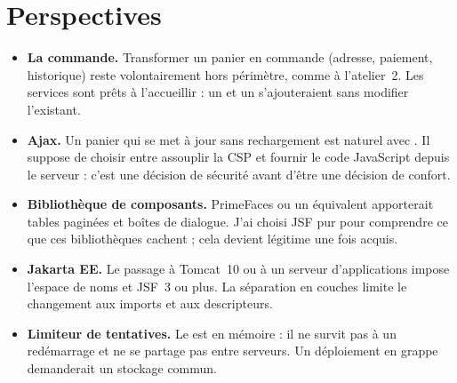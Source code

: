 \chapter{Perspectives}\label{chap:perspectives}

\begin{itemize}
  \item \textbf{La commande.} Transformer un panier en commande (adresse, paiement, historique) reste volontairement
        hors périmètre, comme à l'atelier~2. Les services sont prêts à l'accueillir : un  et un
         s'ajouteraient sans modifier l'existant.
  \item \textbf{Ajax.} Un panier qui se met à jour sans rechargement est naturel avec . Il suppose de
        choisir entre assouplir la CSP et fournir le code JavaScript depuis le serveur : c'est une décision de sécurité
        avant d'être une décision de confort.
  \item \textbf{Bibliothèque de composants.} PrimeFaces ou un équivalent apporterait tables paginées et boîtes de
        dialogue. J'ai choisi JSF pur pour comprendre ce que ces bibliothèques cachent ; cela devient légitime une fois acquis.
  \item \textbf{Jakarta EE.} Le passage à Tomcat~10 ou à un serveur d'applications impose l'espace de noms 
        et JSF~3 ou plus. La séparation en couches limite le changement aux imports et aux descripteurs.
  \item \textbf{Limiteur de tentatives.} Le  est en mémoire : il ne survit pas à un redémarrage et ne se
        partage pas entre serveurs. Un déploiement en grappe demanderait un stockage commun.
\end{itemize}
